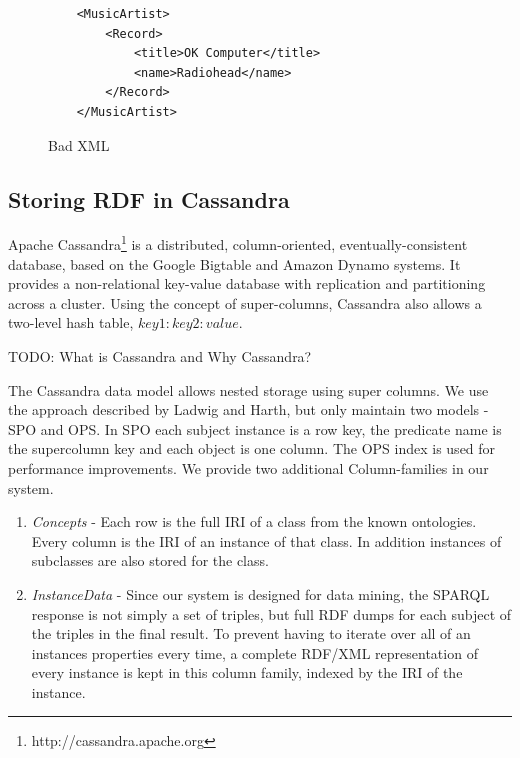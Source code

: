 \documentclass[conference]{IEEEtran}
\begin{document}
\begin{figure}
    \caption{Bad XML}
    \label{ex:xml-bad}
    \begin{verbatim}
    <MusicArtist>
        <Record>
            <title>OK Computer</title>
            <name>Radiohead</name>
        </Record>
    </MusicArtist>
    \end{verbatim}
\end{figure}

\subsection{Storing RDF in Cassandra}

Apache Cassandra\footnote{http://cassandra.apache.org} is a distributed,
column-oriented, eventually-consistent database, based on the Google
Bigtable\cite{Chang06bigtable:a} and Amazon
Dynamo\cite{Hastorun07dynamo:amazon's} systems. It provides a non-relational
key-value database with replication and partitioning across a cluster. Using
the concept of super-columns, Cassandra also allows a two-level hash table,
${ key1 : { key2 : value } }$.

TODO: What is Cassandra and Why Cassandra?

The Cassandra data model allows nested storage using super columns. We use the
approach described by Ladwig and Harth\cite{ladwig:11}, but only maintain two
models - SPO and OPS. In SPO each subject instance is a row key, the predicate
name is the supercolumn key and each object is one column. The OPS index is
used for performance improvements. We provide two additional Column-families in
our system.

\begin{enumerate}
    \item \emph{Concepts} - Each row is the full IRI of a class from the known
        ontologies. Every column is the IRI of an instance of that class. In
        addition instances of subclasses are also stored for the class.

    \item \emph{InstanceData} - Since our system is designed for data mining,
        the SPARQL response is not simply a set of triples, but full RDF dumps
        for each subject of the triples in the final result. To prevent having
        to iterate over all of an instances properties every time, a complete
        RDF/XML representation of every instance is kept in this column family,
        indexed by the IRI of the instance.

\end{enumerate}
\end{document}
